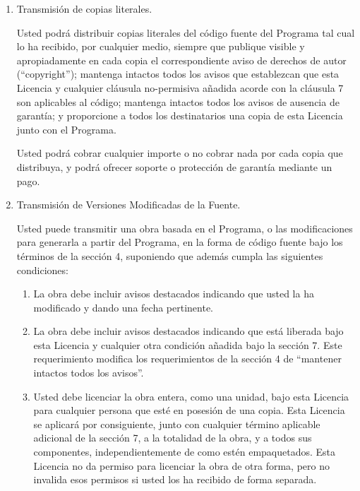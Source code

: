 {\begin{enumerate}
Cuando transmita una obra amparada, renuncia a cualquier poder legal 
para prohibir la evasi\'{o}n de medidas tecnol\'{o}gicas mientras tales evasiones 
se realicen en ejercicio de derechos amparados por esta Licencia respecto 
a la obra amparada; adem\'{a}s, usted renunciar\'{a} a cualquier intenci\'{o}n de 
limitar el uso o modificaci\'{o}n del trabajo con el objetivo de imponer, 
contra el trabajo de los usuarios, sus derechos legales o los de terceros 
para prohibir la evasi\'{o}n de medidas tecnol\'{o}gicas.

\item Transmisi\'{o}n de copias literales.

Usted podr\'{a} distribuir copias literales del c\'{o}digo fuente del 
Programa tal cual lo ha recibido, por cualquier medio, siempre que 
publique visible y apropiadamente en cada copia el correspondiente 
aviso de derechos de autor (``copyright''); mantenga intactos todos los avisos que establezcan 
que esta Licencia y cualquier cl\'{a}usula no-permisiva a\~nadida acorde con 
la cl\'{a}usula 7 son aplicables al c\'{o}digo; mantenga intactos todos los 
avisos de ausencia de garant\'{i}a; y proporcione a todos los destinatarios 
una copia de esta Licencia junto con el Programa.

Usted podr\'{a} cobrar cualquier importe o no cobrar nada por cada copia 
que distribuya, y podr\'{a} ofrecer soporte o protecci\'{o}n de garant\'{i}a 
mediante un pago.

\item Transmisi\'{o}n de Versiones Modificadas de la Fuente.

Usted puede transmitir una obra basada en el Programa, o las 
modificaciones para generarla a partir del Programa, en la forma de 
c\'{o}digo fuente bajo los t\'{e}rminos de la secci\'{o}n 4, suponiendo que adem\'{a}s 
cumpla las siguientes condiciones:

  \begin{enumerate}
  \item La obra debe incluir avisos destacados indicando que usted la ha 
  modificado y dando una fecha pertinente.

  \item La obra debe incluir avisos destacados indicando que est\'{a} 
  liberada bajo esta Licencia y cualquier otra condici\'{o}n a\~nadida bajo 
  la secci\'{o}n 7.  Este requerimiento modifica los requerimientos de la 
  secci\'{o}n 4 de ``mantener intactos todos los avisos''.

  \item Usted debe licenciar la obra entera, como una unidad, bajo esta 
  Licencia para cualquier persona que est\'{e} en posesi\'{o}n de una copia.  
  Esta Licencia se aplicar\'{a} por consiguiente, junto con cualquier 
  t\'{e}rmino aplicable adicional de la secci\'{o}n 7, a la totalidad de la 
  obra, y a todos sus componentes, independientemente de como est\'{e}n 
  empaquetados. Esta Licencia no da permiso para licenciar la obra de 
  otra forma, pero no invalida esos permisos si usted los ha recibido 
  de forma separada.


\end{enumerate}
\end{enumerate}}
